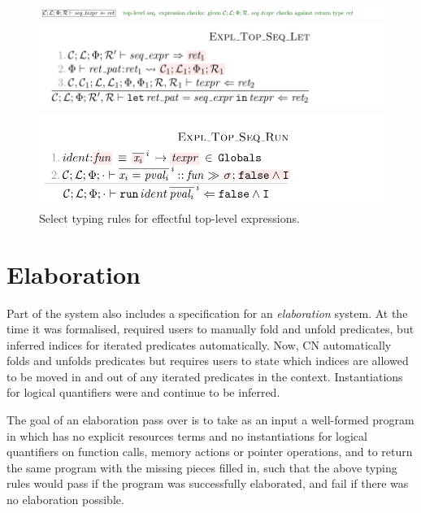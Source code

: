 \begin{figure}[tp]
    \includegraphics{figures/kernel-seq-texpr-typing-1}
    \begin{minipage}{0.7\textwidth}
        \includegraphics{figures/kernel-seq-texpr-typing-2}
    \end{minipage}
    \begin{minipage}{0.7\textwidth}
    \includegraphics{figures/kernel-seq-texpr-typing-3}
    \end{minipage}
    \caption{Select  typing rules for effectful top-level
        expressions.}\label{fig:typing-seq-texpr}
\end{figure}

\section{Elaboration}\label{sec:elaboration}

Part of the  system also includes a specification for an
\emph{elaboration} system. At the time it was formalised, 
required users to manually fold and unfold predicates, but inferred indices for iterated predicates
automatically. Now, CN automatically folds and unfolds predicates but requires
users to state which indices are allowed to be moved in and out of any iterated
predicates in the context.
Instantiations for logical quantifiers were and continue to be inferred.

The goal of an elaboration pass over  is to take as an input a
well-formed program in  which has no explicit resources terms and
no instantiations for logical quantifiers on function calls, memory actions or
pointer operations, and to return the same program with the missing pieces
filled in, such that the above typing rules would pass if the program was
successfully elaborated, and fail if there was no elaboration possible.

